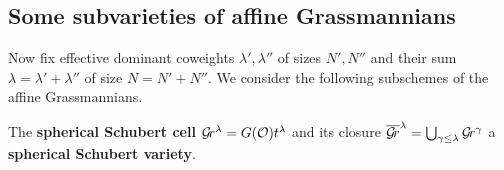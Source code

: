 \documentclass[draft]{article}
\begin{document}

\subsection{Some subvarieties of affine Grassmannians}
Now fix effective dominant coweights $\lambda', \lambda'' $ of sizes $N',N''$  and their sum $ \lambda = \lambda' + \lambda'' $ of size $ N = N'+N''$. 
We consider the following subschemes of the affine Grassmannians.
% 
\begin{definition}
    The \textbf{spherical Schubert cell} $\mathcal{G}\!r^\lambda = G(\mathcal O) t^\lambda$ and its closure 
    $ \overline{\mathcal{G}\!r}^\lambda = \bigcup_{\gamma \le \lambda} \mathcal{G}\!r^{\gamma} $ a \textbf{spherical Schubert variety}.  
\end{definition}
\end{document}
